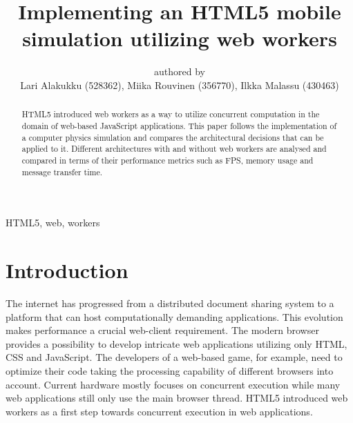 \documentclass[conference]{IEEEtran}
\begin{document}
\title{Implementing an HTML5 mobile simulation utilizing web workers}

\author{authored by\\
        Lari Alakukku (528362),
        Miika Rouvinen (356770),
        Ilkka Malassu (430463)}%

\makeatletter         
\def\@maketitle{
\begin{center}
{\Huge \bfseries \sffamily \@title }\\[4ex] 
Submitted on \@date\\
{\normalsize \@author}\\[4ex] 
\end{center}}
\makeatother


\maketitle

\begin{IEEEkeywords}
HTML5, web, workers
\end{IEEEkeywords}

\begin{abstract}

HTML5 introduced web workers as a way to utilize concurrent computation in the domain of web-based JavaScript applications. This paper follows the implementation
of a computer physics simulation and compares the architectural decisions that can be applied to it. Different architectures with and without web workers are
analysed and compared in terms of their performance metrics such as FPS, memory usage and message transfer time.
 
\end{abstract}

\section{Introduction}
\label{chap:introduction}

The internet has progressed from a distributed document sharing system to a platform that can host computationally demanding applications. This evolution makes performance a crucial web-client requirement. The modern browser provides a possibility to develop intricate web applications utilizing only HTML, CSS and JavaScript. The developers of a web-based game, for example, need to optimize their code taking the processing capability of different browsers into account. Current hardware mostly focuses on concurrent execution while many web applications still only use the main browser thread. HTML5 introduced web workers as a first step towards concurrent execution in web applications. \cite{doha}
\end{document}
